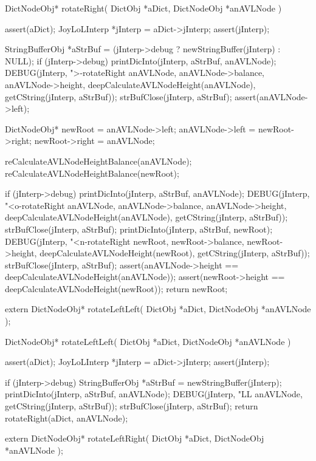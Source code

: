 \startCCode
DictNodeObj* rotateRight(
  DictObj     *aDict,
  DictNodeObj *anAVLNode
) {
  assert(aDict);
  JoyLoLInterp *jInterp = aDict->jInterp;
  assert(jInterp);
  
  StringBufferObj *aStrBuf =
    (jInterp->debug ? newStringBuffer(jInterp) : NULL);
  if (jInterp->debug) {
    printDicInto(jInterp, aStrBuf, anAVLNode);
    DEBUG(jInterp, ">-rotateRight %
          anAVLNode, anAVLNode->balance, anAVLNode->height,
          deepCalculateAVLNodeHeight(anAVLNode),
          getCString(jInterp, aStrBuf));
    strBufClose(jInterp, aStrBuf);
  }
  assert(anAVLNode->left);

  DictNodeObj* newRoot = anAVLNode->left;
  anAVLNode->left = newRoot->right;
  newRoot->right  = anAVLNode;

  reCalculateAVLNodeHeightBalance(anAVLNode);
  reCalculateAVLNodeHeightBalance(newRoot);

  if (jInterp->debug) {
    printDicInto(jInterp, aStrBuf, anAVLNode);
    DEBUG(jInterp, "<o-rotateRight %
          anAVLNode, anAVLNode->balance, anAVLNode->height,
          deepCalculateAVLNodeHeight(anAVLNode),
          getCString(jInterp, aStrBuf));
    strBufClose(jInterp, aStrBuf);
    printDicInto(jInterp, aStrBuf, newRoot);
    DEBUG(jInterp, "<n-rotateRight %
          newRoot, newRoot->balance, newRoot->height,
          deepCalculateAVLNodeHeight(newRoot),
          getCString(jInterp, aStrBuf));
    strBufClose(jInterp, aStrBuf);
  }
  assert(anAVLNode->height == deepCalculateAVLNodeHeight(anAVLNode));
  assert(newRoot->height == deepCalculateAVLNodeHeight(newRoot));
  return newRoot;
}
\stopCCode

\startCHeader
extern DictNodeObj* rotateLeftLeft(
  DictObj     *aDict,
  DictNodeObj *anAVLNode
);
\stopCHeader

\startCCode
DictNodeObj* rotateLeftLeft(
  DictObj     *aDict,
  DictNodeObj *anAVLNode
) {
  assert(aDict);
  JoyLoLInterp *jInterp = aDict->jInterp;
  assert(jInterp);
  
  if (jInterp->debug) {
    StringBufferObj *aStrBuf = newStringBuffer(jInterp);
    printDicInto(jInterp, aStrBuf, anAVLNode);
    DEBUG(jInterp, "LL %
      anAVLNode, getCString(jInterp, aStrBuf));
    strBufClose(jInterp, aStrBuf);
  }
  return rotateRight(aDict, anAVLNode);
}
\stopCCode

\startCHeader
extern DictNodeObj* rotateLeftRight(
  DictObj     *aDict,
  DictNodeObj *anAVLNode
);
\stopCHeader

